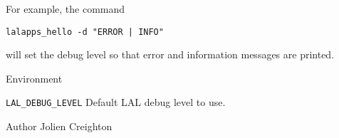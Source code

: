 \begin{entry}
For example, the command
\begin{indented}
\verb$lalapps_hello -d "ERROR | INFO"$
\end{indented}
will set the debug level so that error and information messages are printed.

\item[Environment]\leavevmode

\begin{entry}
\item[\texttt{LAL\_DEBUG\_LEVEL}]
Default LAL debug level to use.
\end{entry}

\item[Author]
Jolien Creighton

\end{entry}
